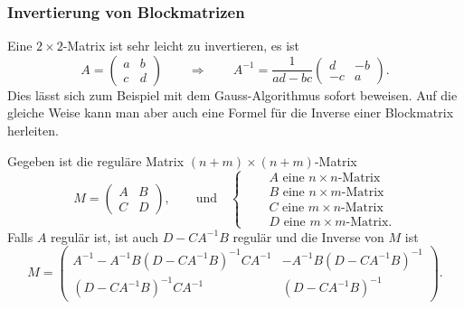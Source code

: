 %
%
\subsubsection{Invertierung von Blockmatrizen}
Eine $2\times 2$-Matrix ist sehr leicht zu invertieren, es ist
\begin{equation}
A=\begin{pmatrix}
a&b\\
c&d
\end{pmatrix}
\qquad\Rightarrow\qquad
A^{-1}
=
\frac{1}{ad-bc}
\begin{pmatrix}
d&-b\\
-c&a
\end{pmatrix}.
\label{buch:qm:eqn:inverse22}
\end{equation}
Dies lässt sich zum Beispiel mit dem Gauss-Algorithmus sofort
beweisen.
Auf die gleiche Weise kann man aber auch eine Formel für die Inverse
einer Blockmatrix herleiten.
%
%

\begin{lemma}
\label{buch:qm:lemma:blockinverse}
Gegeben ist die reguläre Matrix $(n+m)\times(n+m)$-Matrix
\[
M = \begin{pmatrix}
A&B\\
C&D
\end{pmatrix},
\qquad\text{und}\quad\left\{
\quad
\begin{aligned}
&\text{$A$ eine $n\times n$-Matrix}\\
&\text{$B$ eine $n\times m$-Matrix}\\
&\text{$C$ eine $m\times n$-Matrix}\\
&\text{$D$ eine $m\times m$-Matrix}.
\end{aligned}
\right.
\]
Falls $A$ regulär ist, ist auch $D-CA^{-1}B$ regulär und
die Inverse von $M$ ist
\begin{equation}
M
=
\begin{pmatrix}
A^{-1} - A^{-1}B(D-CA^{-1}B)^{-1}CA^{-1}  & -A^{-1}B(D-CA^{-1}B)^{-1} \\
(D-CA^{-1}B)^{-1}CA^{-1}                 & (D-CA^{-1}B)^{-1}
\end{pmatrix}.
\label{buch:qm:eqn:blockinverse}
\end{equation}
\end{lemma}

